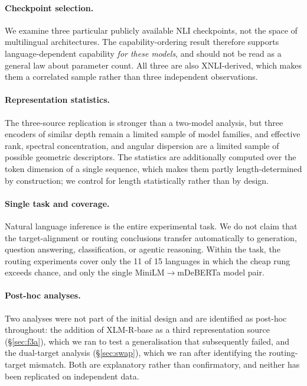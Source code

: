 \documentclass[11pt]{article}
\begin{document}
\paragraph{Checkpoint selection.} We examine three particular publicly available
NLI checkpoints, not the space of multilingual architectures. The
capability-ordering result therefore supports language-dependent capability
\emph{for these models}, and should not be read as a general law about parameter
count. All three are also XNLI-derived, which makes them a correlated sample
rather than three independent observations.

\paragraph{Representation statistics.} The three-source replication is stronger
than a two-model analysis, but three encoders of similar depth remain a limited
sample of model families, and effective rank, spectral concentration, and angular
dispersion are a limited sample of possible geometric descriptors. The statistics
are additionally computed over the token dimension of a single sequence, which
makes them partly length-determined by construction; we control for length
statistically rather than by design.

\paragraph{Single task and coverage.} Natural language inference is the entire
experimental task. We do not claim that the target-alignment or routing
conclusions transfer automatically to generation, question answering,
classification, or agentic reasoning. Within the task, the routing experiments
cover only the 11 of 15 languages in which the cheap rung exceeds chance, and
only the single MiniLM$\rightarrow$mDeBERTa model pair.

\paragraph{Post-hoc analyses.} Two analyses were not part of the initial design
and are identified as post-hoc throughout: the addition of XLM-R-base as a third
representation source (\S\ref{sec:f3a}), which we ran to test a generalisation
that subsequently failed, and the dual-target analysis (\S\ref{sec:swap}), which
we ran after identifying the routing-target mismatch. Both are explanatory rather
than confirmatory, and neither has been replicated on independent data.
\end{document}

